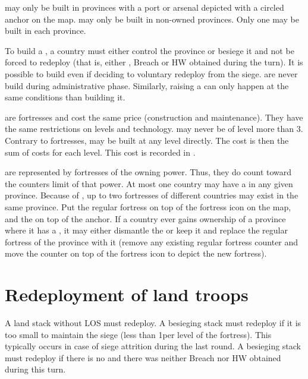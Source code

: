 \label{chRedep:Presidios}
\bparag \Presidios may only be built in provinces with a port or arsenal
depicted with a circled anchor on the map.
\bparag \Presidios may only be built in non-owned provinces.
\bparag Only one \Presidio may be built in each province.

\bparag To build a \Presidio, a country must either control the province or
besiege it and not be forced to redeploy (that is, either \USURE\Faceplus,
Breach or HW obtained during the turn).
\bparag It is possible to build \Presidio even if deciding to voluntary
redeploy from the siege.
\bparag \Presidios are never build during administrative phase. Similarly,
raising a \Presidio can only happen at the same conditions than building it.

\aparag[Cost]
\bparag \Presidios are fortresses and cost the same price (construction and
maintenance). They have the same restrictions on levels and technology.
\bparag \Presidios may never be of level more than 3.
\bparag Contrary to fortresses, \Presidios may be built at any level
directly. The cost is then the sum of costs for each level.
\bparag This cost is recorded in .

\bparag \Presidios are represented by fortresses of the owning power. Thus,
they do count toward the counters limit of that power.
\bparag At most one country may have a \Presidio in any given province.
\bparag Because of \Presidios, up to two fortresses of different countries may
exist in the same province. Put the regular fortress on top of the fortress
icon on the map, and the \Presidio on top of the anchor.
\bparag If a country ever gains ownership of a province where it has a
\Presidio, it may either dismantle the \Presidio or keep it and replace the
regular fortress of the province with it (remove any existing regular fortress
counter and move the \Presidio counter on top of the fortress icon to depict
the new fortress).

\section{Redeployment of land troops}\label{chRedep:Redeployment}
\bparag A land stack without LOS must redeploy.
\bparag A besieging stack must redeploy if it is too small to maintain the
siege (less than 1\LD per level of the fortress). This typically occurs in
case of siege attrition during the last round.
\bparag A besieging stack must redeploy if there is no \USURE\Faceplus and
there was neither Breach nor HW obtained during this turn.

